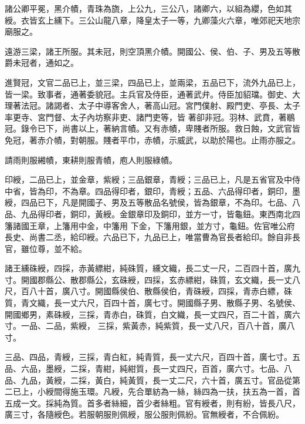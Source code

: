 \begin{pinyinscope}
 諸公卿平冕，黑介幘，青珠為旒，上公九，三公八，諸卿六，以組為纓，色如其綬。衣皆玄上纁下。三公山龍八章，降皇太子一等，九卿藻火六章，唯郊祀天地宗廟服之。



 遠游三梁，諸王所服。其未冠，則空頂黑介幘。開國公、侯、伯、子、男及五等散爵未冠者，通如之。



 進賢冠，文官二品已上，並三梁，四品已上，並兩梁，五品已下，流外九品已上，皆一梁。致事者，通著委貌冠。主兵官及侍臣，通著武弁。侍臣加貂璫。御史、大理著法冠。諸謁者、太子中導客舍人，著高山冠。宮門僕射、殿門吏、亭長、太子率更寺、宮門督、太子內坊察非吏、諸門吏等，皆
 著卻非冠。羽林、武賁，著鶡冠。錄令已下，尚書以上，著納言幘。又有赤幘，卑賤者所服。救日蝕，文武官皆免冠，著赤介幘，對朝服。賤者平巾，赤幘，示威武，以助於陽也。止雨亦服之。



 請雨則服緗幘，東耕則服青幘，庖人則服綠幘。



 印綬，二品已上，並金章，紫綬；三品銀章，青綬；三品已上，凡是五省官及中侍中省，皆為印，不為章。四品得印者，銀印，青綬；五品、六品得印者，銅印，墨綬，四品已下，凡是開國子、男及五等散品名號侯，皆為銀章，不為印。七品、八品、九品得印者，銅印，黃綬。金銀章印及銅印，並方一寸，皆龜鈕。東西南北四籓諸國王章，上籓用中金，中籓用
 下金，下籓用銀，並方寸，龜鈕。佐官唯公府長史、尚書二丞，給印綬。六品已下，九品已上，唯當曹為官長者給印。餘自非長官，雖位尊，並不給。



 諸王纁硃綬，四採，赤黃縹紺，純硃質，纁文織，長二丈一尺，二百四十首，廣九寸。開國郡縣公、散郡縣公，玄硃綬，四採，玄赤縹紺，硃質，玄文織，長一丈八尺，百八十首，廣八寸。開國縣侯伯、散縣侯伯，青硃綬，四採，青赤白縹，硃質，青文織，長一丈六尺，百四十首，廣七寸。開國縣子男、散縣子男、名號侯、開國鄉男，素硃綬，三採，青赤白，硃質，白文織，長一丈四尺，百二十首，廣六寸。一品、二品，紫綬，
 三採，紫黃赤，純紫質，長一丈八尺，百八十首，廣八寸。



 三品、四品，青綬，三採，青白紅，純青質，長一丈六尺，百四十首，廣七寸。五品、六品，墨綬，二採，青紺，純紺質，長一丈四尺，百首，廣六寸。七品、八品、九品，黃綬，二採，黃白，純黃質，長一丈二尺，六十首，廣五寸。官品從第二已上，小綬間得施玉環。凡綬，先合單紡為一絲，絲四為一扶，扶五為一首，首五成一文。採純為質。首多者絲細，首少者絲粗。官有綬者，則有紛，皆長八尺，廣三寸，各隨綬色。若服朝服則佩綬，服公服則佩紛。官無綬者，不合佩紛。




\end{pinyinscope}
